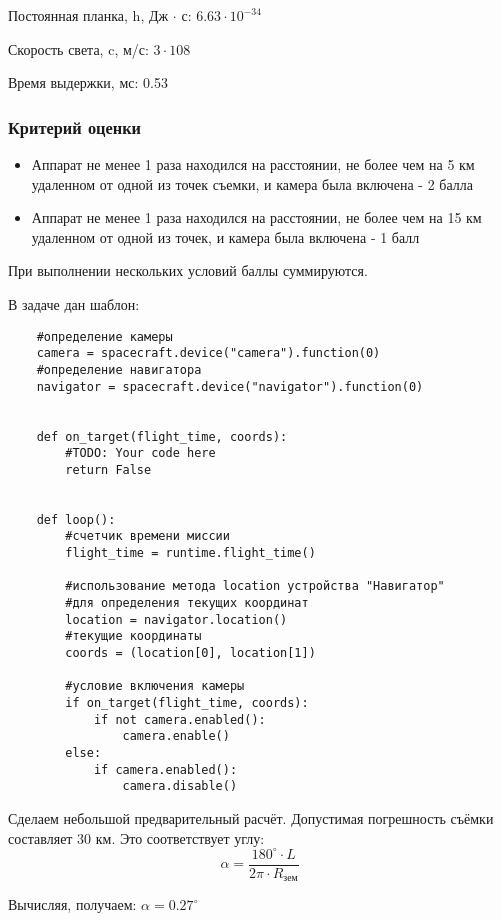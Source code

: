 Постоянная планка, h, Дж $\cdot$ с: $6.63 \cdot 10^{-34}$

Скорость света, c, м/с: $3 \cdot 108$

Время выдержки, мс: 0.53


\subsubsection*{Критерий оценки}

\begin{itemize}
    \item Аппарат не менее 1 раза находился на расстоянии, не более чем на 5 км удаленном от одной из точек съемки, и камера была включена - 2 балла
    \item Аппарат не менее 1 раза находился на расстоянии, не более чем на 15 км удаленном от одной из точек, и камера была включена - 1 балл
\end{itemize}

При выполнении нескольких условий баллы суммируются.

\solutionSection
В задаче дан шаблон:
\begin{verbatim}
    #определение камеры
    camera = spacecraft.device("camera").function(0)
    #определение навигатора
    navigator = spacecraft.device("navigator").function(0)


    def on_target(flight_time, coords):
        #TODO: Your code here
        return False


    def loop():
        #счетчик времени миссии
        flight_time = runtime.flight_time()

        #использование метода location устройства "Навигатор" 
        #для определения текущих координат
        location = navigator.location()
        #текущие координаты
        coords = (location[0], location[1])

        #условие включения камеры
        if on_target(flight_time, coords):
            if not camera.enabled():
                camera.enable()
        else:
            if camera.enabled():
                camera.disable()
\end{verbatim}
Сделаем небольшой предварительный расчёт. Допустимая погрешность съёмки составляет 30 км. Это соответствует углу:
$$ \alpha=\frac{180^\circ \cdot L}{2\pi \cdot R_\text{зем}}$$

Вычисляя, получаем: $\alpha = 0.27^\circ$

